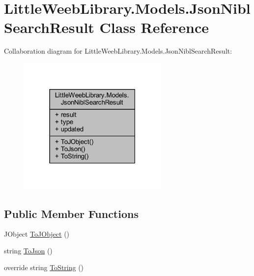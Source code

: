 \hypertarget{class_little_weeb_library_1_1_models_1_1_json_nibl_search_result}{}\section{Little\+Weeb\+Library.\+Models.\+Json\+Nibl\+Search\+Result Class Reference}
\label{class_little_weeb_library_1_1_models_1_1_json_nibl_search_result}


Collaboration diagram for Little\+Weeb\+Library.\+Models.\+Json\+Nibl\+Search\+Result\+:\nopagebreak
\begin{figure}[H]
\begin{center}
\leavevmode
\includegraphics[width=210pt]{class_little_weeb_library_1_1_models_1_1_json_nibl_search_result__coll__graph}
\end{center}
\end{figure}
\subsection*{Public Member Functions}
\begin{DoxyCompactItemize}
\item 
J\+Object \mbox{\hyperlink{class_little_weeb_library_1_1_models_1_1_json_nibl_search_result_a7041262210bce963fd7291a826761891}{To\+J\+Object}} ()
\item 
string \mbox{\hyperlink{class_little_weeb_library_1_1_models_1_1_json_nibl_search_result_a0d6ce8593661ae3dab31882c85b1cff7}{To\+Json}} ()
\item 
override string \mbox{\hyperlink{class_little_weeb_library_1_1_models_1_1_json_nibl_search_result_ad0ccabee81ba5885580d9516f4db4099}{To\+String}} ()
\end{DoxyCompactItemize}
